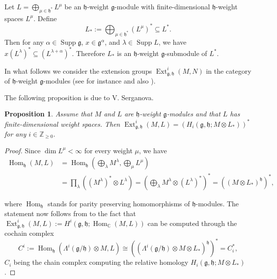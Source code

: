 \documentclass[12pt]{amsart}
\newcommand\C{\mathbb{C}}
\newcommand\Z{\mathbb{Z}}
\newcommand\g{\mathfrak{g}}
\newcommand\fh{\mathfrak{h}}
\DeclareMathOperator{\Hom}{Hom}
\DeclareMathOperator{\Ext}{Ext}
\DeclareMathOperator{\Supp}{Supp} %
\theoremstyle{plain}
\newtheorem{prop}[theo]{Proposition}
\theoremstyle{definition}
\numberwithin{equation}{section}
\begin{document}
Let $L = \bigoplus_{\mu\in \fh^*} L^\mu$ be an $\fh$-weight $\g$-module with finite-dimensional $\fh$-weight spaces $L^\mu$. Define
\begin{equation}\label{eq:lower.dual}
L_*:=\bigoplus_{\mu\in \fh^*} (L^\mu)^* \subseteq L^*.
\end{equation}
Then for any $\alpha\in \Supp \g$, $x\in \g^\alpha$, and $\lambda\in\Supp L$, we have $x(L^\lambda)^*\subseteq (L^{\lambda+\alpha})^*$. Therefore $L_*$ is an $\fh$-weight $\g$-submodule of $L^*$.

In what follows we consider the extension groups $\Ext_{\g, \fh}^i (M,N)$ in the category of $\fh$-weight $\g$-modules (see for instance \cite{Fuk86} and also \cite{Mus12}). 

The following proposition is due to V. Serganova.

\begin{prop}\label{prop:ext.homology}
Assume that $M$ and $L$ are $\fh$-weight $\g$-modules and that $L$ has  finite-dimensional weight spaces. Then $\Ext_{\g, \fh}^i (M,L) = (H_i(\g, \fh; M\otimes L_*))^*$ for any $i\in \Z_{\geq 0}$.
\end{prop}
\begin{proof}
Since $\dim L^\mu < \infty$ for every weight $\mu$, we have
\begin{equation} \label{eq:coho.homo}
\begin{split}
\Hom_\fh (M, L) & = \Hom_\fh \left(\bigoplus_\lambda M^\lambda, \bigoplus_\mu L^\mu\right)  \\
& = \prod_\lambda ((M^\lambda)^*\otimes L^\lambda) = \left(\bigoplus_\lambda M^\lambda\otimes (L^\lambda)^*\right)^* = \left( (M\otimes L_*)^\fh\right)^*,
\end{split}
\end{equation}

\noindent where $\Hom_\fh$ stands for parity preserving homomorphisms of $\fh$-modules. The statement now follows from to the fact that $\Ext_{\g, \fh}^i (M,L) := H^i(\g,\fh;\Hom_\C(M,L))$ can be computed through the cochain complex
	\[
C^i := \Hom_\fh(\Lambda^i(\g/\fh)\otimes M, L)\cong \left( (\Lambda^i(\g/\fh)\otimes M \otimes L_*)^\fh\right)^* = C_i^*,
	\]
$C_i$ being the chain complex computing the relative homology $H_i(\g,\fh; M\otimes L_*)$.
\end{proof}
\end{document}
